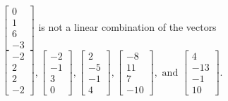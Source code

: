 \begin{exercise}
\begin{exerciseStatement}
  \end{exerciseStatement}
  \begin{exerciseAnswer}
   \(\left[\begin{array}{c}
0 \\
1 \\
6 \\
-3
\end{array}\right]\) 
  	 is not  
	a linear combination of the vectors \(\left[\begin{array}{c}
-2 \\
2 \\
2 \\
-2
\end{array}\right] , \left[\begin{array}{c}
-2 \\
-1 \\
3 \\
0
\end{array}\right] , \left[\begin{array}{c}
2 \\
-5 \\
-1 \\
4
\end{array}\right] , \left[\begin{array}{c}
-8 \\
11 \\
7 \\
-10
\end{array}\right] , \text{ and } \left[\begin{array}{c}
4 \\
-13 \\
-1 \\
10
\end{array}\right]\).

	
  


  \end{exerciseAnswer}
\end{exercise}